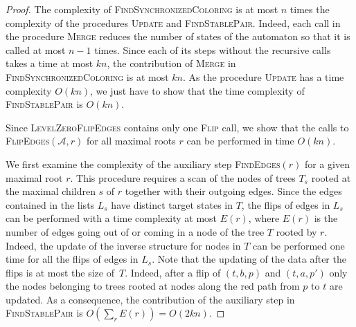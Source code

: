 \documentclass[11pt,a4paper]{article}
\def\A{\mathcal{A}}
\begin{document}
\begin{proof} 
  The complexity of \textsc{FindSynchronizedColoring} is at most $n$ times the
  complexity of the procedures \textsc{Update} and
  \textsc{FindStablePair}.  Indeed, each call in the procedure
  \textsc{Merge} reduces the number of states of the automaton so that
  it is called at most $n-1$ times. Since each of its steps without the
  recursive calls takes a time at most $kn$, the contribution of
  \textsc{Merge} in \textsc{FindSynchronizedColoring} is at most $kn$.  As the
  procedure \textsc{Update} has a time complexity $O(kn)$, we just
  have to show that the time complexity of
  \textsc{FindStablePair} is $O(kn)$.

  Since \textsc{LevelZeroFlipEdges} contains only one \textsc{Flip}
  call, we show that the calls to \textsc{FlipEdges}$(\A,r)$ for all
  maximal roots $r$ can be performed in time $O(kn)$.

  We first examine the complexity of the auxiliary step
  \textsc{FindEdges}$(r)$ for a given maximal root $r$.  This
  procedure requires a scan of the nodes of trees $T_s$ rooted at the
  maximal children $s$ of $r$ together with their outgoing edges.
  Since the edges contained in the lists $L_s$ have distinct target
  states in $T$, the flips of edges in $L_s$ can be performed with a
  time complexity at most $E(r)$, where $E(r)$ is the number of edges
  going out of or coming in a node of the tree $T$ rooted by $r$.
  Indeed, the update of the inverse structure for nodes in $T$ can be
  performed one time for all the flips of edges in $L_s$.  Note that
  the updating of the data after the flips is at most the size
  of~$T$. Indeed, after a flip of $(t,b,p)$ and $(t,a,p')$ only the
  nodes belonging to trees rooted at nodes along the red path from $p$
  to $t$ are updated.  As a consequence, the contribution of the
  auxiliary step in \textsc{FindStablePair} is $O(\sum_r E(r))=
  O(2kn)$.


\end{proof}
\end{document}
